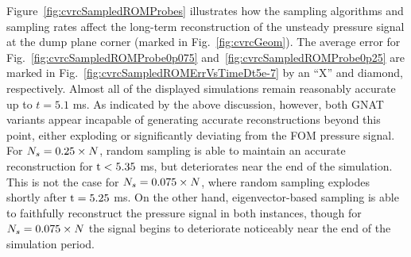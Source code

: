 Figure~\ref{fig:cvrcSampledROMProbes} illustrates how the sampling algorithms and sampling rates affect the long-term reconstruction of the unsteady pressure signal at the dump plane corner (marked in Fig.~\ref{fig:cvrcGeom}). The average error for Fig.~\ref{fig:cvrcSampledROMProbe0p075} and~\ref{fig:cvrcSampledROMProbe0p25} are marked in Fig.~\ref{fig:cvrcSampledROMErrVsTimeDt5e-7} by an ``X'' and diamond, respectively. Almost all of the displayed simulations remain reasonably accurate up to $t = 5.1$ ms. As indicated by the above discussion, however, both GNAT variants appear incapable of generating accurate reconstructions beyond this point, either exploding or significantly deviating from the FOM pressure signal. For $N_s = 0.25 \times N$, random sampling is able to maintain an accurate reconstruction for $\text{t} < 5.35$ ms, but deteriorates near the end of the simulation. This is not the case for $N_s = 0.075 \times N$, where random sampling explodes shortly after $\text{t} = 5.25$ ms. On the other hand, eigenvector-based sampling is able to faithfully reconstruct the pressure signal in both instances, though for $N_s = 0.075 \times N$ the signal begins to deteriorate noticeably near the end of the simulation period.

